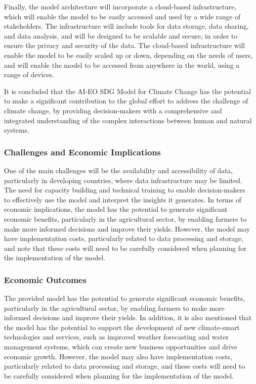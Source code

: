 \documentclass[draft, {\secondLanguage}, english]{volcanica-template}
\begin{document}
Finally, the model architecture will incorporate a cloud-based infrastructure, which will enable the model to be easily accessed and used by a wide range of stakeholders. The infrastructure will include tools for data storage, data sharing, and data analysis, and will be designed to be scalable and secure, in order to ensure the privacy and security of the data. The cloud-based infrastructure will enable the model to be easily scaled up or down, depending on the needs of users, and will enable the model to be accessed from anywhere in the world, using a range of devices.

It is concluded that the AI-EO SDG Model for Climate Change has the potential to make a significant contribution to the global effort to address the challenge of climate change, by providing decision-makers with a comprehensive and integrated understanding of the complex interactions between human and natural systems.


\subsubsection{Challenges and Economic Implications}
One of the main challenges will be the availability and accessibility of data, particularly in developing countries, where data infrastructure may be limited. The need for capacity building and technical training to enable decision-makers to effectively use the model and interpret the insights it generates. In terms of economic implications, the model has the potential to generate significant economic benefits, particularly in the agricultural sector, by enabling farmers to make more informed decisions and improve their yields. However, the model may have implementation costs, particularly related to data processing and storage, and note that these costs will need to be carefully considered when planning for the implementation of the model.

\subsubsection{Economic Outcomes}
The provided model has the potential to generate significant economic benefits, particularly in the agricultural sector, by enabling farmers to make more informed decisions and improve their yields. In addition, it is also mentioned that the model has the potential to support the development of new climate-smart technologies and services, such as improved weather forecasting and water management systems, which can create new business opportunities and drive economic growth. However, the model may also have implementation costs, particularly related to data processing and storage, and these costs will need to be carefully considered when planning for the implementation of the model. 
\end{document}
